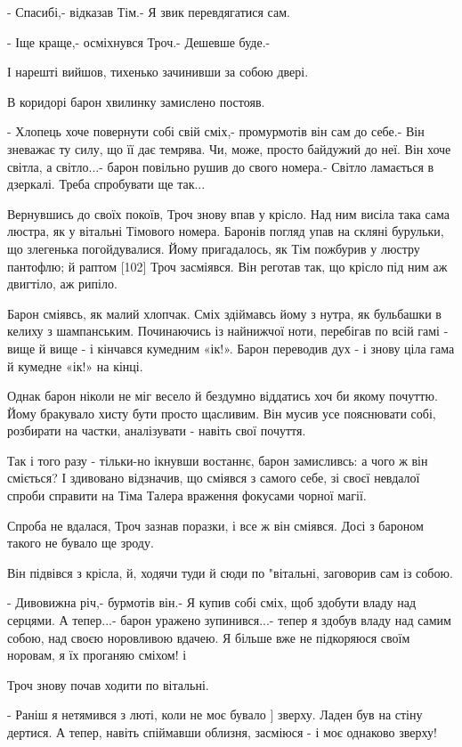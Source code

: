 - Спасибі,- відказав Тім.- Я звик перевдягатися сам.

- Іще краще,- осміхнувся Троч.- Дешевше буде.-

І нарешті вийшов, тихенько зачинивши за собою двері.

В коридорі барон хвилинку замислено постояв.

- Хлопець хоче повернути собі свій сміх,- промурмотів він сам до себе.- Він зневажає ту силу, що її дає темрява. Чи, може, просто байдужий до неї. Він хоче світла, а світло...- барон повільно рушив до свого номера.- Світло ламається в дзеркалі. Треба спробувати ще так...

Вернувшись до своїх покоїв, Троч знову впав у крісло. Над ним висіла така сама люстра, як у вітальні Тімового номера. Баронів погляд упав на скляні бурульки, що злегенька погойдувалися. Йому пригадалось, як Тім пожбурив у люстру пантофлю; й раптом [102] Троч засміявся. Він реготав так, що крісло під ним аж двигтіло, аж рипіло.

Барон сміявсь, як малий хлопчак. Сміх здіймавсь йому з нутра, як бульбашки в келиху з шампанським. Починаючись із найнижчої ноти, перебігав по всій гамі - вище й вище - і кінчався кумедним «ік!». Барон переводив дух - і знову ціла гама й кумедне «ік!» на кінці.

Однак барон ніколи не міг весело й бездумно віддатись хоч би якому почуттю. Йому бракувало хисту бути просто щасливим. Він мусив усе пояснювати собі, розбирати на частки, аналізувати - навіть свої почуття.

Так і того разу - тільки-но ікнувши востаннє, барон замисливсь: а чого ж він сміється? І здивовано відзначив, що сміявся з самого себе, зі своєї невдалої спроби справити на Тіма Талера враження фокусами чорної магії.

Спроба не вдалася, Троч зазнав поразки, і все ж він сміявся. Досі з бароном такого не бувало ще зроду.

Він підвівся з крісла, й, ходячи туди й сюди по "вітальні, заговорив сам із собою.

- Дивовижна річ,- бурмотів він.- Я купив собі сміх, щоб здобути владу над серцями. А тепер...- барон уражено зупинився...- тепер я здобув владу над самим собою, над своєю норовливою вдачею. Я більше вже не підкоряюся своїм норовам, я їх проганяю сміхом! і

Троч знову почав ходити по вітальні.

- Раніш я нетямився з люті, коли не моє бувало ] зверху. Ладен був на стіну дертися. А тепер, навіть спіймавши облизня, засміюся - і моє однаково зверху!

